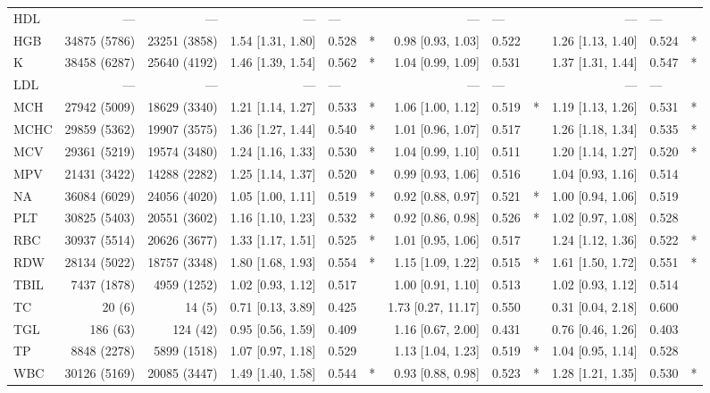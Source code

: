 \begin{table}[ht]
\begin{tabular}{lrrrlcrlcrlc}
HDL & --- & --- & --- & --- &  & --- & --- &  & --- & --- &  \\
HGB & 34875 (5786) & 23251 (3858) & 1.54 [1.31, 1.80] & 0.528 & * & 0.98 [0.93, 1.03] & 0.522 &  & 1.26 [1.13, 1.40] & 0.524 & * \\
K & 38458 (6287) & 25640 (4192) & 1.46 [1.39, 1.54] & 0.562 & * & 1.04 [0.99, 1.09] & 0.531 &  & 1.37 [1.31, 1.44] & 0.547 & * \\
LDL & --- & --- & --- & --- &  & --- & --- &  & --- & --- &  \\
MCH & 27942 (5009) & 18629 (3340) & 1.21 [1.14, 1.27] & 0.533 & * & 1.06 [1.00, 1.12] & 0.519 & * & 1.19 [1.13, 1.26] & 0.531 & * \\
MCHC & 29859 (5362) & 19907 (3575) & 1.36 [1.27, 1.44] & 0.540 & * & 1.01 [0.96, 1.07] & 0.517 &  & 1.26 [1.18, 1.34] & 0.535 & * \\
MCV & 29361 (5219) & 19574 (3480) & 1.24 [1.16, 1.33] & 0.530 & * & 1.04 [0.99, 1.10] & 0.511 &  & 1.20 [1.14, 1.27] & 0.520 & * \\
MPV & 21431 (3422) & 14288 (2282) & 1.25 [1.14, 1.37] & 0.520 & * & 0.99 [0.93, 1.06] & 0.516 &  & 1.04 [0.93, 1.16] & 0.514 &  \\
NA & 36084 (6029) & 24056 (4020) & 1.05 [1.00, 1.11] & 0.519 & * & 0.92 [0.88, 0.97] & 0.521 & * & 1.00 [0.94, 1.06] & 0.519 &  \\
PLT & 30825 (5403) & 20551 (3602) & 1.16 [1.10, 1.23] & 0.532 & * & 0.92 [0.86, 0.98] & 0.526 & * & 1.02 [0.97, 1.08] & 0.528 &  \\
RBC & 30937 (5514) & 20626 (3677) & 1.33 [1.17, 1.51] & 0.525 & * & 1.01 [0.95, 1.06] & 0.517 &  & 1.24 [1.12, 1.36] & 0.522 & * \\
RDW & 28134 (5022) & 18757 (3348) & 1.80 [1.68, 1.93] & 0.554 & * & 1.15 [1.09, 1.22] & 0.515 & * & 1.61 [1.50, 1.72] & 0.551 & * \\
TBIL & 7437 (1878) & 4959 (1252) & 1.02 [0.93, 1.12] & 0.517 &  & 1.00 [0.91, 1.10] & 0.513 &  & 1.02 [0.93, 1.12] & 0.514 &  \\
TC & 20 (6) & 14 (5) & 0.71 [0.13, 3.89] & 0.425 &  & 1.73 [0.27, 11.17] & 0.550 &  & 0.31 [0.04, 2.18] & 0.600 &  \\
TGL & 186 (63) & 124 (42) & 0.95 [0.56, 1.59] & 0.409 &  & 1.16 [0.67, 2.00] & 0.431 &  & 0.76 [0.46, 1.26] & 0.403 &  \\
TP & 8848 (2278) & 5899 (1518) & 1.07 [0.97, 1.18] & 0.529 &  & 1.13 [1.04, 1.23] & 0.519 & * & 1.04 [0.95, 1.14] & 0.528 &  \\
WBC & 30126 (5169) & 20085 (3447) & 1.49 [1.40, 1.58] & 0.544 & * & 0.93 [0.88, 0.98] & 0.523 & * & 1.28 [1.21, 1.35] & 0.530 & * \\
\bottomrule
\end{tabular}
\end{table}